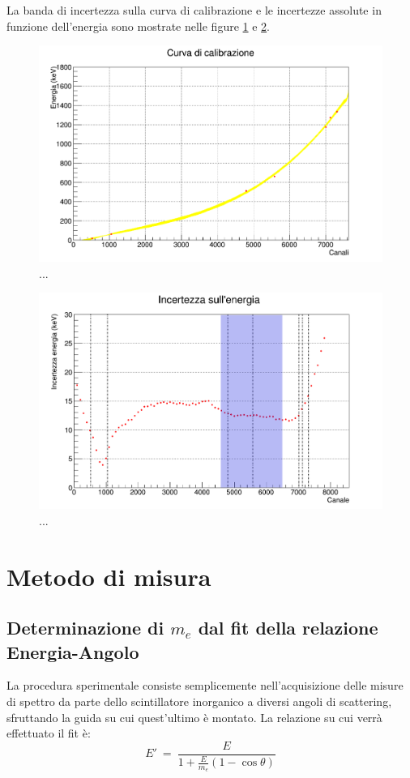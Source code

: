 \documentclass[11pt]{article}
\begin{document}
La banda di incertezza sulla curva di calibrazione e le incertezze assolute in funzione dell'energia sono mostrate nelle figure \ref{fig:calib_en} e \ref{fig:err_en}.

\begin{figure}[h!] 
\includegraphics[width=\textwidth]{"calibrazione2"}
\caption{...}
\label{fig:calib_en}
\end{figure}

\begin{figure}[h!] 
\includegraphics[width=\textwidth]{"err_en4"}
\caption{...}
\label{fig:err_en}
\end{figure}


\section{Metodo di misura}
\subsection{Determinazione di $m_e$ dal fit della relazione Energia-Angolo}
La procedura sperimentale consiste semplicemente nell'acquisizione delle misure di spettro da parte dello scintillatore inorganico a diversi angoli di scattering, sfruttando la guida su cui quest'ultimo è montato. La relazione su cui verrà effettuato il fit è:
\begin{equation}
E'\ = \ \frac{E}{1+\frac{E}{m_e}\left(1-\cos{\theta}\right)}
\end{equation}
\end{document}
